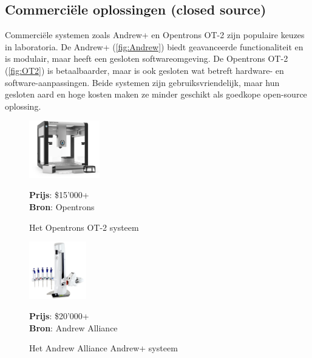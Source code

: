 \subsection{Commerciële oplossingen (closed source)}
Commerciële systemen zoals Andrew+ en Opentrons OT-2 zijn populaire keuzes in laboratoria. De Andrew+ (\autoref{fig:Andrew}) biedt geavanceerde functionaliteit en is modulair, maar heeft een gesloten softwareomgeving. De Opentrons OT-2 (\autoref{fig:OT2}) is betaalbaarder, maar is ook gesloten wat betreft hardware- en software-aanpassingen. Beide systemen zijn gebruiksvriendelijk, maar hun gesloten aard en hoge kosten maken ze minder geschikt als goedkope open-source oplossing.
\\[12pt]
\begin{minipage}[t]{0.49\textwidth}
    \vspace{0pt}
    \begin{figure}[H]
        \centering
        \captionsetup{width=0.85\textwidth}
        \includegraphics[height=2.5cm]{figures/opentronsot2.png}
        \caption{Het Opentrons OT-2 systeem}\label{fig:OT2}
        \textbf{Prijs}: \$15'000+\\
        \textbf{Bron}: Opentrons\ \cite{RN27}
    \end{figure}
\end{minipage}
\begin{minipage}[t]{0.49\textwidth}
    \vspace{0pt}
    \begin{figure}[H]
        \centering
        \captionsetup{width=0.85\textwidth}
        \includegraphics[height=2.5cm]{figures/Andrew-Alliance-liquid-handling-robot.png}
        \caption{Het Andrew Alliance Andrew+ systeem}\label{fig:Andrew}
        \textbf{Prijs}: \$20'000+ \\ 
        \textbf{Bron}: Andrew Alliance\ \cite{RN28}
    \end{figure}
\end{minipage}

